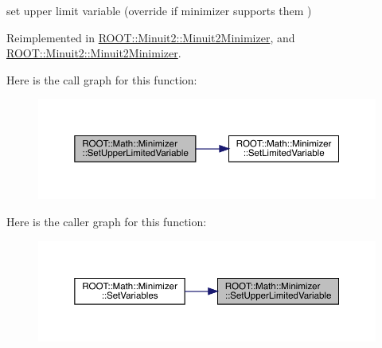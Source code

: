 set upper limit variable (override if minimizer supports them ) 



Reimplemented in \mbox{\hyperlink{classROOT_1_1Minuit2_1_1Minuit2Minimizer_a70209b37c419af5d8d1475ce8de29b43}{R\+O\+O\+T\+::\+Minuit2\+::\+Minuit2\+Minimizer}}, and \mbox{\hyperlink{classROOT_1_1Minuit2_1_1Minuit2Minimizer_a70209b37c419af5d8d1475ce8de29b43}{R\+O\+O\+T\+::\+Minuit2\+::\+Minuit2\+Minimizer}}.

Here is the call graph for this function\+:
\nopagebreak
\begin{figure}[H]
\begin{center}
\leavevmode
\includegraphics[width=350pt]{dc/dc4/classROOT_1_1Math_1_1Minimizer_a804843fbaea82809b3c54232d0c1fe86_cgraph}
\end{center}
\end{figure}
Here is the caller graph for this function\+:\nopagebreak
\begin{figure}[H]
\begin{center}
\leavevmode
\includegraphics[width=350pt]{dc/dc4/classROOT_1_1Math_1_1Minimizer_a804843fbaea82809b3c54232d0c1fe86_icgraph}
\end{center}
\end{figure}
\mbox{\label{classROOT_1_1Math_1_1Minimizer_a804843fbaea82809b3c54232d0c1fe86}} 
